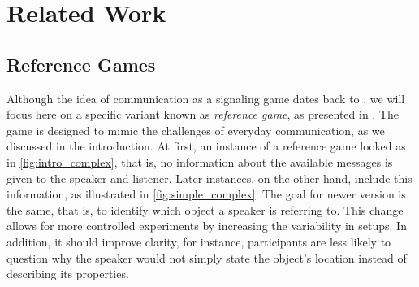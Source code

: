 ﻿\chapter{Related Work}
\section{Reference Games}
Although the idea of communication as a signaling game dates back to \cite{Lewis_1969}, we will focus here on a specific variant known as \textit{reference game}, as presented in \cite{Frank_2012}. The game is designed to mimic the challenges of everyday communication, as we discussed in the introduction. At first, an instance of a reference game looked as in \autoref{fig:intro_complex}, that is, no information about the available messages is given to the speaker and listener. Later instances, on the other hand, include this information, as illustrated in \autoref{fig:simple_complex}. The goal for newer version is the same, that is, to identify which object a speaker is referring to. This change allows for more controlled experiments by increasing the variability in setups. In addition, it should improve clarity, for instance, participants are less likely to question why the speaker would not simply state the object's location instead of describing its properties.

